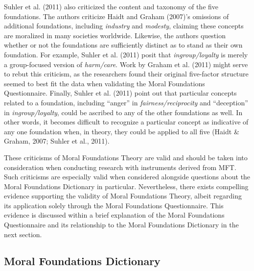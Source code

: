 \documentclass[english,,man]{apa6}
\begin{document}
Suhler et al. (2011) also criticized the content and taxonomy of the five foundations. The authors criticize Haidt and Graham (2007)'s omissions of additional foundations, including \emph{industry} and \emph{modesty}, claiming these concepts are moralized in many societies worldwide. Likewise, the authors question whether or not the foundations are sufficiently distinct as to stand as their own foundation. For example, Suhler et al. (2011) posit that \emph{ingroup/loyalty} is merely a group-focused version of \emph{harm/care}. Work by Graham et al. (2011) might serve to rebut this criticism, as the researchers found their original five-factor structure seemed to best fit the data when validating the Moral Foundations Questionnaire. Finally, Suhler et al. (2011) point out that particular concepts related to a foundation, including \enquote{anger} in \emph{fairness/reciprocity} and \enquote{deception} in \emph{ingroup/loyalty}, could be ascribed to any of the other foundations as well. In other words, it becomes difficult to recognize a particular concept as indicative of any one foundation when, in theory, they could be applied to all five (Haidt \& Graham, 2007; Suhler et al., 2011).

These criticisms of Moral Foundations Theory are valid and should be taken into consideration when conducting research with instruments derived from MFT. Such criticisms are especially valid when considered alongside questions about the Moral Foundations Dictionary in particular. Nevertheless, there exists compelling evidence supporting the validity of Moral Foundations Theory, albeit regarding its application solely through the Moral Foundations Questionnaire. This evidence is discussed within a brief explanation of the Moral Foundations Questionnaire and its relationship to the Moral Foundations Dictionary in the next section.

\hypertarget{moral-foundations-dictionary}{%
\subsection{Moral Foundations Dictionary}\label{moral-foundations-dictionary}}
\end{document}
